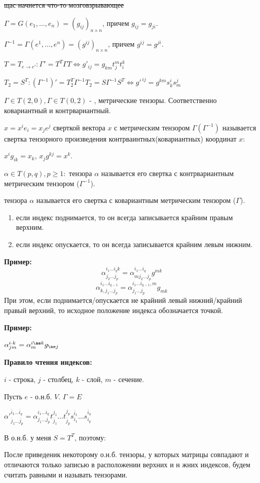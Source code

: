 \sout{щас начнется что-то мозговзрывающее}

$\Gamma = G(e_1,\ldots,e_n)=(g_{ij})_{n \times n}$, причем $g_{ij}=g_{ji}$.

$\Gamma^{-1}= \Gamma (e^1,\ldots, e^n)= (g^{ij})_{n\times n}$, причем $g^{ij} = g^{ji}$.

$T = T_{e\rightarrow e'}: \Gamma' = T^T \Gamma T \Leftrightarrow g'_{ij}= g_{km}t_j^m t_i^k$

$T_2 = S^T: (\Gamma^{-1})' = T_2^T \Gamma^{-1} T_2 = S \Gamma^{-1}S^T \Leftrightarrow g'^{\, ij} = g^{km}s_k^i s_m^j$

 $\Gamma \in T(2,0), \Gamma\in T(0,2)$ - , метрические тензоры. Соответственно ковариантный и контрвариантный.

 $x = x^ie_i = x_j e^j$ сверткой вектора $x$ с метрическим тензором $\Gamma(\Gamma^{-1})$ называется свертка тензорного произведения контрваинтных(ковариантных) координат $x$:

$x^i g_{ik} = x_k$, $x_j g^{kj}= x^k$.

 $\alpha \in T(p,q), p \geq 1:$  тензора $\alpha$ называется его свертка с контрвариантным метрическим тензором ($\Gamma^{-1}$).

 тензора $\alpha$ называется его свертка с ковариантным метрическим тензором ($\Gamma$).

\begin{enumerate}
    \item если индекс поднимается, то он всегда записывается крайним правым верхним.
    \item если индекс опускается, то он всегда записывается крайним левым нижним.
\end{enumerate}

\textbf{Пример:}
$$\alpha_{j_2\ldots j_p}^{i_1\ldots i_qk} = \alpha^{i_1\ldots i_q}_{mj_2\ldots j_p} g^{mk}$$
$$\alpha_{k,j_1\ldots j_p}^{i_1\ldots i_{q-1}} = \alpha^{i_1\ldots i_{q-1},m}_{j_1\ldots j_p} g_{mk}$$
При этом, если поднимается/опускается не крайний левый нижний/крайний правый верхний, то исходное положение индекса обозначается точкой. 

\textbf{Пример:}

$\alpha^{i \cdot k}_{jm} = \alpha^{i \ae k}_m g_{\ae j}$

\textbf{Правило чтения индексов:}

$i$ - строка, $j$ - столбец, $k$ - слой, $m$ - сечение.

Пусть $e$ - о.н.б. $V$. $\Gamma =E$

$\alpha'^{\overline{i}_1\ldots \overline{i}_q}_{\overline{j}_1 \ldots \overline{j}_p} = \alpha^{i_1 \ldots i_q}_{j_1\ldots j_p} t_{\overline{j}_1}^{j_1}\ldots t_{\overline{j}_p}^{j_p}s_{i_1}^{\overline{i}_1}\ldots s_{i_q}^{\overline{i}_q} $

В о.н.б.  у меня $S = T^T$, поэтому:

После приведеник некоторому о.н.б. тензоры, у которых матрицы совпадают и отличаются только записью в расположении верхних и н жних индексов, будем считать равными и называть  тензорами.

